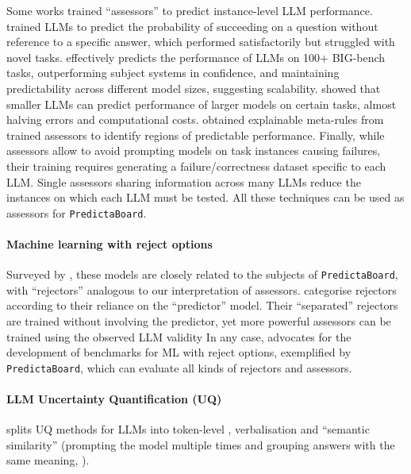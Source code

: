\documentclass[11pt]{article}
\newcommand{\predbench}{{\tt PredictaBoard}\xspace}
\begin{document}
Some works trained ``assessors'' to predict instance-level LLM performance. %
\citet{kadavath2022language} trained LLMs to predict the probability of succeeding on a question without reference to %
a specific answer, %
which performed satisfactorily but struggled with novel tasks. 
\citet{schellaert2024analysing} effectively predicts the performance of LLMs on 100+ BIG-bench tasks, outperforming subject systems in confidence, and maintaining predictability across different model sizes, suggesting scalability.
\citet{zhou2022reject}  showed that smaller LLMs can %
predict performance of %
larger models %
on certain tasks, almost halving errors and computational costs. %
\citet{DRAPAL2024112351} obtained explainable meta-rules from trained assessors to identify regions of predictable performance. 
Finally, while assessors allow to avoid prompting models on task instances causing failures, their training requires generating a failure/correctness dataset specific to each LLM. Single assessors  sharing information across many LLMs \citet{pacchiardi2024100instancesneedpredicting} reduce the instances on which each LLM must be tested.
All these techniques can be used as assessors for 
\predbench.


\paragraph{Machine learning with reject options} %
Surveyed by \citet{hendrickx2024machine}, these models are closely related %
to the subjects of \predbench, with ``rejectors'' analogous to our interpretation of assessors. \citet{hendrickx2024machine} categorise rejectors according to their reliance on the ``predictor'' model.  %
Their ``separated'' rejectors are trained without involving the predictor, yet more powerful assessors %
can be trained using the observed LLM validity %
In any case, \citet{hendrickx2024machine} advocates for the %
development of benchmarks for %
ML with reject options, exemplified by %
\predbench, which can evaluate all kinds of rejectors and assessors.%

\paragraph{LLM Uncertainty Quantification (UQ)}
\citet{shorinwa} splits UQ methods for LLMs into token-level \citep{kadavath2022language}, verbalisation \citep{lin2022teaching, kapoor} and ``semantic similarity'' (prompting the model multiple times and grouping answers with the same meaning, \citealp{kuhn2023semantic}). 
\end{document}
